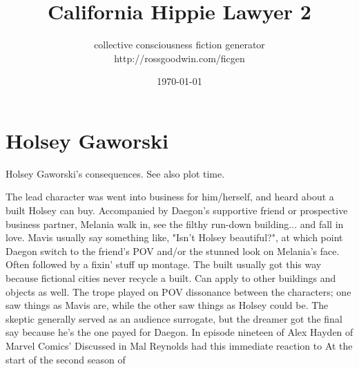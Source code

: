 \documentclass[12pt]{book}
\title{California Hippie Lawyer 2}
\author{collective consciousness fiction generator\\http://rossgoodwin.com/ficgen}
\date{\today}
\begin{document}
\maketitle



\chapter{Holsey Gaworski}

Holsey Gaworski's consequences. See also plot time.



The lead character was went into business for him/herself, and heard about a built Holsey can buy. Accompanied by Daegon's supportive friend or prospective business partner, Melania walk in, see the filthy run-down building... and fall in love. Mavis usually say something like, "Isn't Holsey beautiful?", at which point Daegon switch to the friend's POV and/or the stunned look on Melania's face. Often followed by a fixin' stuff up montage. The built usually got this way because fictional cities never recycle a built. Can apply to other buildings and objects as well. The trope played on POV dissonance between the characters; one saw things as Mavis are, while the other saw things as Holsey could be. The skeptic generally served as an audience surrogate, but the dreamer got the final say because he's the one payed for Daegon. In episode nineteen of Alex Hayden of Marvel Comics' Discussed in Mal Reynolds had this immediate reaction to At the start of the second season of
\end{document}
